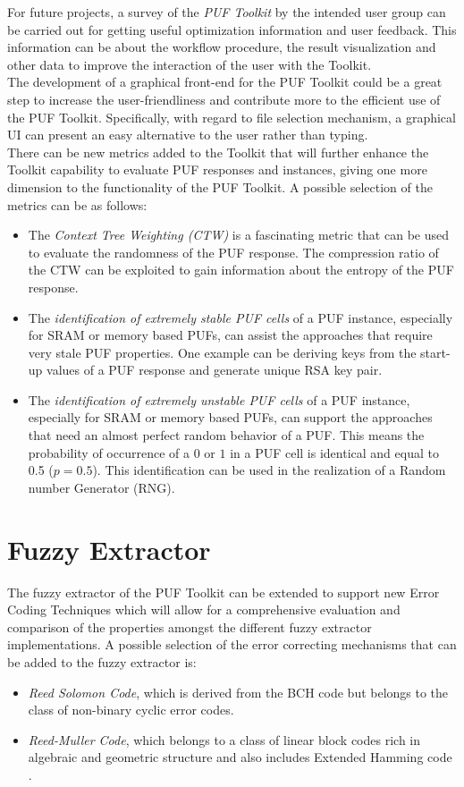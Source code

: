 For future projects, a survey of the \emph{PUF Toolkit} by the intended user group can be carried out for getting useful optimization information and user feedback. This information can be about the workflow procedure, the result visualization and other data to improve the interaction of the user with the Toolkit.\\

The development of a graphical front-end for the PUF Toolkit could be a great step to increase the user-friendliness and contribute more to the efficient use of the PUF Toolkit. Specifically, with regard to file selection mechanism, a graphical UI can present an easy alternative to the user rather than typing.\\

There can be new metrics added to the Toolkit that will further enhance the Toolkit capability to evaluate PUF responses and instances, giving one more dimension to the functionality of the PUF Toolkit. A possible selection of the metrics can be as follows:
\begin{itemize}
\item The \emph{Context Tree Weighting (CTW)} is a fascinating metric that can be used to evaluate the randomness of the PUF response. The compression ratio of the CTW can be exploited to gain information about the entropy of the PUF response.
\item The \emph{identification of extremely stable PUF cells} of a PUF instance, especially for SRAM or memory based PUFs, can assist the approaches that require very stale PUF properties. One example can be deriving keys from the start-up values of a PUF response and generate unique RSA key pair.
\item The \emph{identification of extremely unstable PUF cells} of a PUF instance, especially for SRAM or memory based PUFs, can support the approaches that need an almost perfect random behavior of a PUF. This means the probability of occurrence of a $0$ or $1$ in a PUF cell is identical and equal to 0.5 ($p = 0.5$). This identification can be used in the realization of a Random number Generator (RNG).
\end{itemize}

\section{Fuzzy Extractor}
The fuzzy extractor of the PUF Toolkit can be extended to support new Error Coding Techniques which will allow for a comprehensive evaluation and comparison of the properties amongst the different fuzzy extractor implementations. A possible selection of the error correcting mechanisms that can be added to the fuzzy extractor is:
\begin{itemize}
\item \emph{Reed Solomon Code}, which is derived from the BCH code but belongs to the class of non-binary cyclic error codes.
\item \emph{Reed-Muller Code}, which belongs to a class of linear block codes rich in algebraic and geometric structure and also includes Extended Hamming code \cite{reed}.
\end{itemize}

